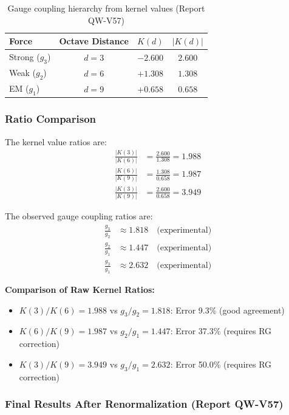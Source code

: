 \documentclass[11pt, a4paper]{article}
\begin{document}
\begin{table}[htbp]
\centering
\caption{Gauge coupling hierarchy from kernel values (Report QW-V57)}
\label{tab:gauge_hierarchy}
\begin{tabular}{lccc}
\toprule
Force & Octave Distance & $K(d)$ & $|K(d)|$ \\
\midrule
Strong ($g_3$) & $d = 3$ & $-2.600$ & $2.600$ \\
Weak ($g_2$) & $d = 6$ & $+1.308$ & $1.308$ \\
EM ($g_1$) & $d = 9$ & $+0.658$ & $0.658$ \\
\bottomrule
\end{tabular}
\end{table}

\subsubsection{Ratio Comparison}

The kernel value ratios are:
\begin{align}
\frac{|K(3)|}{|K(6)|} &= \frac{2.600}{1.308} = 1.988\\
\frac{|K(6)|}{|K(9)|} &= \frac{1.308}{0.658} = 1.987\\
\frac{|K(3)|}{|K(9)|} &= \frac{2.600}{0.658} = 3.949
\end{align}

The observed gauge coupling ratios are:
\begin{align}
\frac{g_3}{g_2} &\approx 1.818 \quad \text{(experimental)}\\
\frac{g_2}{g_1} &\approx 1.447 \quad \text{(experimental)}\\
\frac{g_3}{g_1} &\approx 2.632 \quad \text{(experimental)}
\end{align}

\textbf{Comparison of Raw Kernel Ratios:}
\begin{itemize}
    \item $K(3)/K(6) = 1.988$ vs $g_3/g_2 = 1.818$: Error 9.3\% (good agreement)
    \item $K(6)/K(9) = 1.987$ vs $g_2/g_1 = 1.447$: Error 37.3\% (requires RG correction)
    \item $K(3)/K(9) = 3.949$ vs $g_3/g_1 = 2.632$: Error 50.0\% (requires RG correction)
\end{itemize}

\subsubsection{Final Results After Renormalization (Report QW-V57)}
\end{document}
